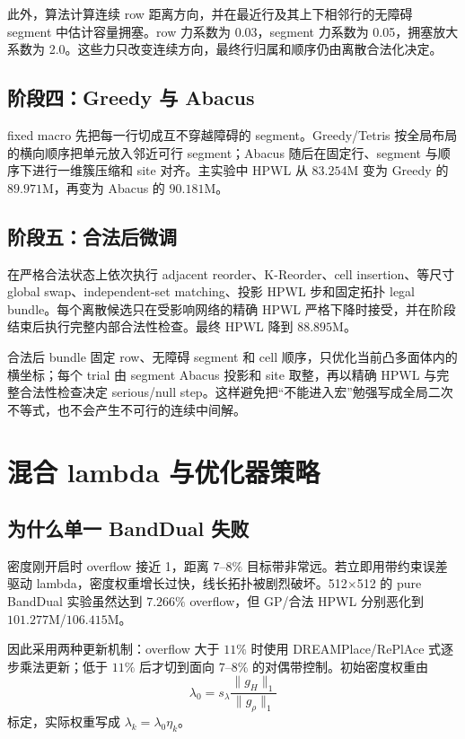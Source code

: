\documentclass[11pt,a4paper]{ctexart}
\begin{document}
此外，算法计算连续 row 距离方向，并在最近行及其上下相邻行的无障碍 segment 中估计容量拥塞。row 力系数为 0.03，segment 力系数为 0.05，拥塞放大系数为 2.0。这些力只改变连续方向，最终行归属和顺序仍由离散合法化决定。

\subsection{阶段四：Greedy 与 Abacus}

fixed macro 先把每一行切成互不穿越障碍的 segment。Greedy/Tetris 按全局布局的横向顺序把单元放入邻近可行 segment；Abacus 随后在固定行、segment 与顺序下进行一维簇压缩和 site 对齐。主实验中 HPWL 从 $83.254$M 变为 Greedy 的 $89.971$M，再变为 Abacus 的 $90.181$M。

\subsection{阶段五：合法后微调}

在严格合法状态上依次执行 adjacent reorder、K-Reorder、cell insertion、等尺寸 global swap、independent-set matching、投影 HPWL 步和固定拓扑 legal bundle。每个离散候选只在受影响网络的精确 HPWL 严格下降时接受，并在阶段结束后执行完整内部合法性检查。最终 HPWL 降到 $88.895$M。

合法后 bundle 固定 row、无障碍 segment 和 cell 顺序，只优化当前凸多面体内的横坐标；每个 trial 由 segment Abacus 投影和 site 取整，再以精确 HPWL 与完整合法性检查决定 serious/null step。这样避免把“不能进入宏”勉强写成全局二次不等式，也不会产生不可行的连续中间解。

\section{混合 lambda 与优化器策略}

\subsection{为什么单一 BandDual 失败}

密度刚开启时 overflow 接近 1，距离 $7$--$8\%$ 目标带非常远。若立即用带约束误差驱动 lambda，密度权重增长过快，线长拓扑被剧烈破坏。512$\times$512 的 pure BandDual 实验虽然达到 $7.266\%$ overflow，但 GP/合法 HPWL 分别恶化到 $101.277$M/$106.415$M。

因此采用两种更新机制：overflow 大于 $11\%$ 时使用 DREAMPlace/RePlAce 式逐步乘法更新；低于 $11\%$ 后才切到面向 $7$--$8\%$ 的对偶带控制。初始密度权重由
\begin{equation}
\lambda_0=s_\lambda\frac{\|g_H\|_1}{\|g_\rho\|_1}
\end{equation}
标定，实际权重写成 $\lambda_k=\lambda_0\eta_k$。
\end{document}
